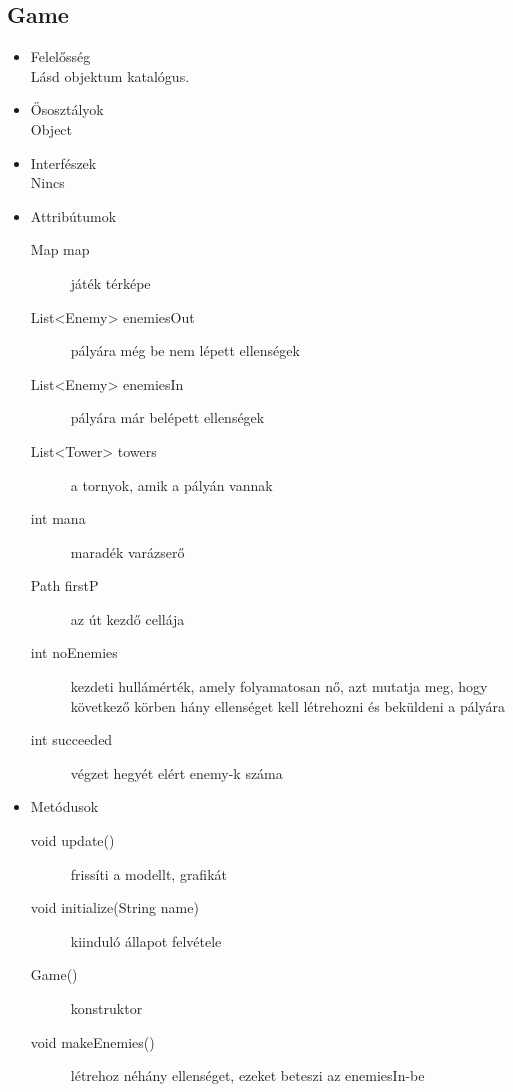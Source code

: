 \subsection{Game}
\begin{itemize}
\item Felelősség\\
Lásd objektum katalógus.
\item Ősosztályok\\
Object
\item Interfészek\\
Nincs
\item Attribútumok\\
	\begin{description}
		\item[Map map] játék térképe
\item[List<Enemy> enemiesOut] pályára még be nem lépett ellenségek
\item[List<Enemy> enemiesIn] pályára már belépett ellenségek
\item[List<Tower> towers] a tornyok, amik a pályán vannak
\item[int mana] maradék varázserő
\item[Path firstP] az út kezdő cellája
\item[int noEnemies] kezdeti hullámérték, amely folyamatosan nő, azt mutatja meg, hogy következő körben hány ellenséget kell létrehozni és beküldeni a pályára
\item[int succeeded] végzet hegyét elért enemy-k száma



		
	\end{description}
\item Metódusok\\
	\begin{description}
		\item[void update()] frissíti a modellt, grafikát
\item[void initialize(String name)] kiinduló állapot felvétele
\item[Game()] konstruktor
\item[void makeEnemies()] létrehoz néhány ellenséget, ezeket beteszi az enemiesIn-be

		
		
	\end{description}
\end{itemize}
